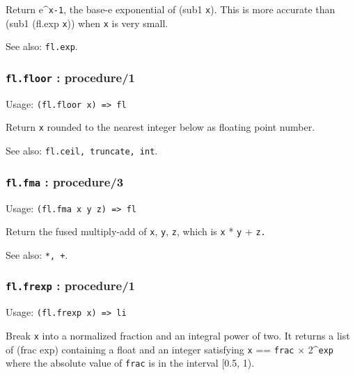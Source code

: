 \documentclass[
]{article}
\newcommand{\passthrough}[1]{#1}
\begin{document}
Return e\^{}\passthrough{\lstinline!x-1!}, the base-e exponential of
(sub1 \passthrough{\lstinline!x!}). This is more accurate than (sub1
(fl.exp \passthrough{\lstinline!x!})) when \passthrough{\lstinline!x!}
is very small.

See also: \passthrough{\lstinline!fl.exp!}.

\hypertarget{fl.floor-procedure1}{%
\subsubsection{\texorpdfstring{\texttt{fl.floor} :
procedure/1}{fl.floor : procedure/1}}\label{fl.floor-procedure1}}

Usage: \passthrough{\lstinline!(fl.floor x) => fl!}

Return \passthrough{\lstinline!x!} rounded to the nearest integer below
as floating point number.

See also: \passthrough{\lstinline!fl.ceil, truncate, int!}.

\hypertarget{fl.fma-procedure3}{%
\subsubsection{\texorpdfstring{\texttt{fl.fma} :
procedure/3}{fl.fma : procedure/3}}\label{fl.fma-procedure3}}

Usage: \passthrough{\lstinline!(fl.fma x y z) => fl!}

Return the fused multiply-add of \passthrough{\lstinline!x!},
\passthrough{\lstinline!y!}, \passthrough{\lstinline!z!}, which is
\passthrough{\lstinline!x!} * \passthrough{\lstinline!y!} +
\passthrough{\lstinline!z.!}

See also: \passthrough{\lstinline!*, +!}.

\hypertarget{fl.frexp-procedure1}{%
\subsubsection{\texorpdfstring{\texttt{fl.frexp} :
procedure/1}{fl.frexp : procedure/1}}\label{fl.frexp-procedure1}}

Usage: \passthrough{\lstinline!(fl.frexp x) => li!}

Break \passthrough{\lstinline!x!} into a normalized fraction and an
integral power of two. It returns a list of (frac exp) containing a
float and an integer satisfying \passthrough{\lstinline!x!} ==
\passthrough{\lstinline!frac!} × 2\^{}\passthrough{\lstinline!exp!}
where the absolute value of \passthrough{\lstinline!frac!} is in the
interval {[}0.5, 1).
\end{document}
